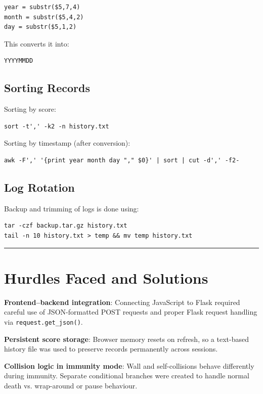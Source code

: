 \documentclass[12pt,a4paper]{article}
\newcommand{\sectionsep}{
    \vspace{1.5em}
    \noindent\rule{\textwidth}{0.8pt}
    \vspace{1.5em}
}
\begin{document}
\begin{lstlisting}
year = substr($5,7,4)
month = substr($5,4,2)
day = substr($5,1,2)
\end{lstlisting}

This converts it into:

\begin{verbatim}
YYYYMMDD
\end{verbatim}

\subsection{Sorting Records}

Sorting by score:

\begin{lstlisting}
sort -t',' -k2 -n history.txt
\end{lstlisting}

Sorting by timestamp (after conversion):

\begin{lstlisting}
awk -F',' '{print year month day "," $0}' | sort | cut -d',' -f2-
\end{lstlisting}

\subsection{Log Rotation}

Backup and trimming of logs is done using:

\begin{lstlisting}
tar -czf backup.tar.gz history.txt
tail -n 10 history.txt > temp && mv temp history.txt
\end{lstlisting}
\sectionsep

\section{Hurdles Faced and Solutions}

\textbf{Frontend--backend integration}: Connecting JavaScript to Flask required careful use of JSON-formatted POST requests and proper Flask request handling via \texttt{request.get\_json()}.

\textbf{Persistent score storage}: Browser memory resets on refresh, so a text-based history file was used to preserve records permanently across sessions.

\textbf{Collision logic in immunity mode}: Wall and self-collisions behave differently during immunity. Separate conditional branches were created to handle normal death vs. wrap-around or pause behaviour.
\end{document}
